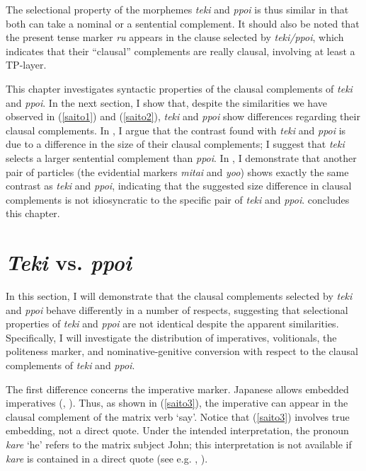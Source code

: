 \documentclass[output=paper]{langscibook}
\begin{document}
The selectional property of the morphemes \emph{teki} and \emph{ppoi} is thus similar in that both can take a nominal or a sentential complement. It should also be noted that the present tense marker \emph{ru} appears in the clause selected by \emph{teki/ppoi}, which indicates that their “clausal” complements are really clausal, involving at least a TP-layer.

This chapter investigates syntactic properties of the clausal complements of \emph{teki} and \emph{ppoi}. In the next section, I show that, despite the similarities we have observed in (\ref{saito1}) and (\ref{saito2}), \emph{teki} and \emph{ppoi} show differences regarding their clausal complements. In , I argue that the contrast found with \emph{teki} and \emph{ppoi} is due to a difference in the size of their clausal complements; I suggest that \emph{teki} selects a larger sentential complement than \emph{ppoi}. In , I demonstrate that another pair of particles (the evidential markers \emph{mitai} and \emph{yoo}) shows exactly the same contrast as \emph{teki} and \emph{ppoi}, indicating that the suggested size difference in clausal complements is not idiosyncratic to the specific pair of \emph{teki} and \emph{ppoi}.  concludes this chapter.



\section{\textit{Teki} vs. \textit{ppoi}} \label{saitos2}

In this section, I will demonstrate that the clausal complements selected by \emph{teki} and \emph{ppoi} behave differently in a number of respects, suggesting that selectional properties of \emph{teki} and \emph{ppoi} are not identical despite the apparent similarities. Specifically, I will investigate the distribution of imperatives, volitionals, the politeness marker, and nominative-genitive conversion with respect to the clausal complements of \emph{teki} and \emph{ppoi}.

The first difference concerns the imperative marker. Japanese allows embedded imperatives (\citealt{Oshima2006}, \citealt{Schwager2006}). Thus, as shown in (\ref{saito3}), the imperative can appear in the clausal complement of the matrix verb ‘say’. Notice that (\ref{saito3}) involves true embedding, not a direct quote. Under the intended interpretation, the pronoun \emph{kare} ‘he’ refers to the matrix subject John; this interpretation is not available if \emph{kare} is contained in a direct quote (see e.g. \citealt{anand2006}, \citealt{crnictrinh2009}).
\end{document}
